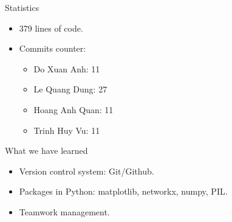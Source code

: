 \documentclass[10pt]{beamer}
\begin{document}
\begin{frame}{Statistics}
  \begin{itemize}
    \item 379 lines of code.
    \item Commits counter:
    \begin{itemize}
      \item Do Xuan Anh: 11
      \item Le Quang Dung: 27
      \item Hoang Anh Quan: 11
      \item Trinh Huy Vu: 11
    \end{itemize}
  \end{itemize}
\end{frame}

\begin{frame}{What we have learned}
  \begin{itemize}
    \item Version control system: Git/Github.
    \item Packages in Python: matplotlib, networkx, numpy, PIL.
    \item Teamwork management.
  \end{itemize}
\end{frame}

{%
\begin{frame}{}
\end{frame}
}
\end{document}
